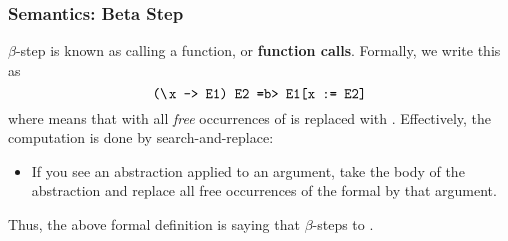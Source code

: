 \documentclass[letterpaper]{article}
\begin{document}
\subsubsection{Semantics: Beta Step}
$\beta$-step is known as calling a function, or \textbf{function calls}. Formally, we write this as 
\[\code{(\bsttt{x} -> E1) E2 =b> E1[x := E2]}\]
where  means that  with all \emph{free} occurrences of  is replaced with . Effectively, the computation is done by search-and-replace: 
\begin{itemize}
    \item If you see an abstraction applied to an argument, take the body of the abstraction and replace all free occurrences of the formal by that argument. 
\end{itemize}
Thus, the above formal definition is saying that  $\beta$-steps to .

\bigskip 
\end{document}
